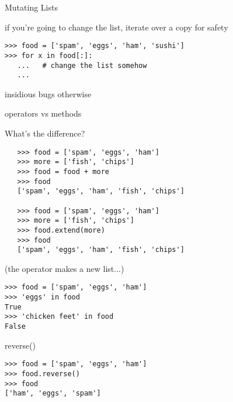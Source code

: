 \documentclass{beamer}
\begin{document}
\begin{frame}[fragile]{Mutating Lists}

{\Large if you're going to change the list, iterate over a copy for safety }

\begin{verbatim}
>>> food = ['spam', 'eggs', 'ham', 'sushi']
>>> for x in food[:]:
   ...   # change the list somehow
   ...
\end{verbatim}

{\Large insidious bugs otherwise}

\end{frame} 

\begin{frame}[fragile]{operators vs methods}

{\large What's the difference?}

\begin{verbatim}
   >>> food = ['spam', 'eggs', 'ham']
   >>> more = ['fish', 'chips']
   >>> food = food + more
   >>> food
   ['spam', 'eggs', 'ham', 'fish', 'chips']

   >>> food = ['spam', 'eggs', 'ham']
   >>> more = ['fish', 'chips']
   >>> food.extend(more)
   >>> food
   ['spam', 'eggs', 'ham', 'fish', 'chips']
\end{verbatim}
(the operator makes a new list...)

\end{frame} 

\begin{frame}[fragile]{in}

\begin{verbatim}
>>> food = ['spam', 'eggs', 'ham']
>>> 'eggs' in food
True
>>> 'chicken feet' in food
False
\end{verbatim}

\end{frame} 

\begin{frame}[fragile]{reverse()}


\begin{verbatim}
>>> food = ['spam', 'eggs', 'ham']
>>> food.reverse()
>>> food
['ham', 'eggs', 'spam']
\end{verbatim}

\end{frame} 
\end{document}
